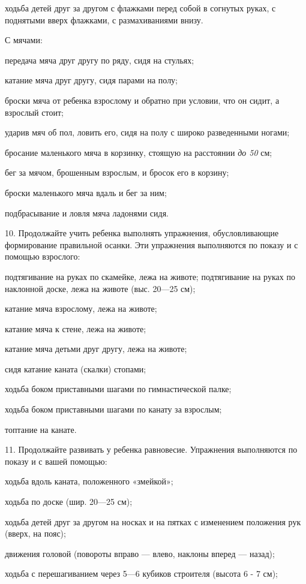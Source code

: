 \documentclass[a5paper]{book}
\renewcommand{\emph}[1]{\textit{#1}}
\begin{document}
ходьба детей друг за другом с флажками перед собой в согнутых руках, с
поднятыми вверх флажками, с размахиваниями внизу.

С мячами:

передача мяча друг другу по ряду, сидя на стульях;

катание мяча друг другу, сидя парами на полу;

броски мяча от ребенка взрослому и обратно при условии, что он сидит, а
взрослый стоит;

ударив мяч об пол, ловить его, сидя на полу с широко разведенными
ногами;

бросание маленького мяча в корзинку, стоящую на расстоянии \emph{до 50}
см;

бег за мячом, брошенным взрослым, и бросок его в корзину;

броски маленького мяча вдаль и бег за ним;

подбрасывание и ловля мяча ладонями сидя.

10. Продолжайте учить ребенка выполнять упражнения, обусловливающие
формирование правильной осанки. Эти упражнения выполняются по показу и с
помощью взрослого:

подтягивание на руках по скамейке, лежа на животе; подтягивание на руках
по наклонной доске, лежа на животе (выс. 20---25 см);

катание мяча взрослому, лежа на животе;

катание мяча к стене, лежа на животе;

катание мяча детьми друг другу, лежа на животе;

сидя катание каната (скалки) стопами;

ходьба боком приставными шагами по гимнастической палке;

ходьба боком приставными шагами по канату за взрослым;

топтание на канате.

11. Продолжайте развивать у ребенка равновесие. Упражнения выполняются
по показу и с вашей помощью:

ходьба вдоль каната, положенного «змейкой»;

ходьба по доске (шир. 20---25 см);

ходьба детей друг за другом на носках и на пятках с изменением положения
рук (вверх, на пояс);

движения головой (повороты вправо --- влево, наклоны вперед --- назад);

ходьба с перешагиванием через 5---6 кубиков строителя (высота 6 - 7 см);
\end{document}
